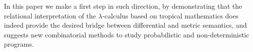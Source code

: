 In this paper we make a first step in such direction, by demonstrating that the relational interpretation of the $\lambda$-calculus based on tropical mathematics does indeed provide the desired bridge between differential and metric semantics, and suggests new combinatorial methods to study probabilistic and non-deterministic programs.%



%
%
%
